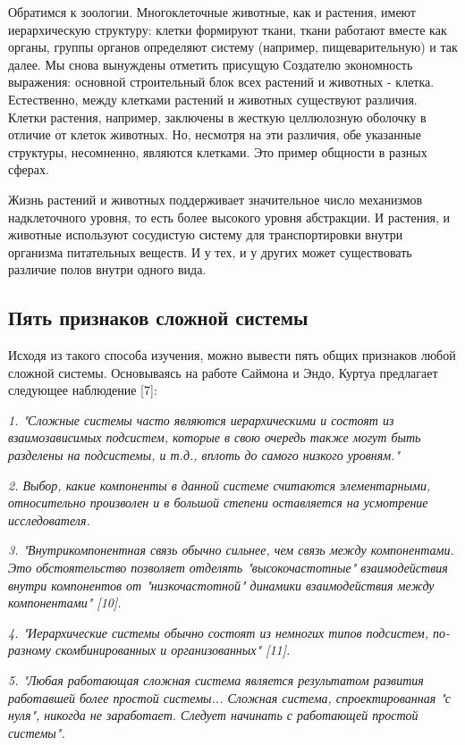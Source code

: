 \documentclass[a4paper,12pt]{article}
\begin{document}
\begin{small}
Обратимся к зоологии. Многоклеточные животные, как и растения, имеют иерархическую структуру: клетки формируют ткани, ткани работают вместе как органы, группы органов определяют систему (например, пищеварительную) и так далее. Мы снова вынуждены отметить присущую Создателю экономность выражения: основной строительный блок всех растений и животных - клетка. Естественно, между клетками растений и животных существуют различия. Клетки растения, например, заключены в жесткую целлюлозную оболочку в отличие от клеток животных. Но, несмотря на эти различия, обе указанные структуры, несомненно, являются клетками. Это пример общности в разных сферах. \par \medskip
Жизнь растений и животных поддерживает значительное число механизмов надклеточного уровня, то есть более высокого уровня абстракции. И растения, и животные используют сосудистую систему для транспортировки внутри организма питательных веществ. И у тех, и у других может существовать различие полов внутри одного вида.
\end{small} 
\newpage
\subsection{Пять признаков сложной системы}
\begin{small}
\parindent=1.25cm
\hspace{1.25 cm}
Исходя из такого способа изучения, можно вывести пять общих признаков любой сложной системы. Основываясь на работе Саймона и Эндо, Куртуа предлагает следующее наблюдение [7]: \par \medskip
\textit{1. "Сложные системы часто являются иерархическими и состоят из взаимозависимых подсистем, которые в свою очередь также могут быть разделены на подсистемы, и т.д., вплоть до самого низкого уровням."} \par \medskip
\textit{2. Выбор, какие компоненты в данной системе считаются элементарными, относительно произволен и в большой степени оставляется на усмотрение исследователя.} \par \medskip
\textit{3. "Внутрикомпонентная связь обычно сильнее, чем связь между компонентами. Это обстоятельство позволяет отделять "высокочастотные" взаимодействия внутри компонентов от "низкочастотной" динамики взаимодействия между компонентами" [10].}\par \medskip 
\textit{4. "Иерархические системы обычно состоят из немногих типов подсистем, по-разному скомбинированных и организованных" [11].} \par \medskip
\textit{5. "Любая работающая сложная система является результатом развития работавшей более простой системы... Сложная система, спроектированная "с нуля", никогда не заработает. Следует начинать с работающей простой системы".} \par \medskip

\end{small}
\end{document}
